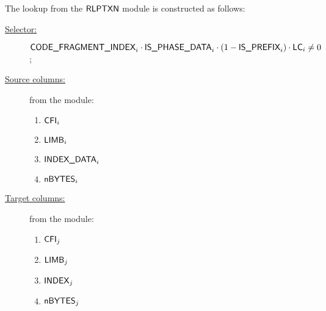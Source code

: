 The lookup from the $\textsf{RLPTXN}$ module is constructed as follows:
\begin{description}
	\item[\underline{Selector:}] $\textsf{CODE\_FRAGMENT\_INDEX}_{i} \cdot \textsf{IS\_PHASE\_DATA}_{i} \cdot (1 - \textsf{IS\_PREFIX}_{i}) \cdot \textsf{LC}_{i} \neq 0$;
	\item[\underline{Source columns:}] from the \rlpTxnMod{} module:
	\begin{multicols}{3}
	\begin{enumerate}
		\item $\textsf{CFI}_{i}$
		\item $\textsf{LIMB}_{i}$
		\item $\textsf{INDEX\_DATA}_{i}$
		\item $\textsf{nBYTES}_{i}$
	\end{enumerate}
	\end{multicols}
\item[\underline{Target columns:}] from the \romMod{} module: 
	\begin{multicols}{3}
	\begin{enumerate}
		\item $\textsf{CFI}_{j}$
		\item $\textsf{LIMB}_{j}$
		\item $\textsf{INDEX}_{j}$
		\item $\textsf{nBYTES}_{j}$
	\end{enumerate} 
	\end{multicols}
\end{description}
